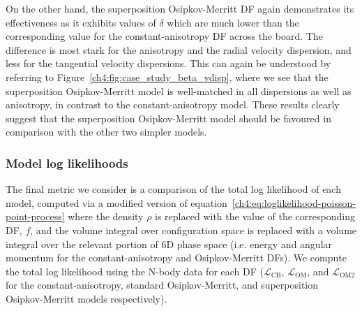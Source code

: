 On the other hand, the superposition Osipkov-Merritt DF again demonstrates its effectiveness as it exhibits values of $\delta$ which are much lower than the corresponding value for the constant-anisotropy DF across the board. The difference is most stark for the anisotropy and the radial velocity dispersion, and less for the tangential velocity dispersions. This can again be understood by referring to Figure~\ref{ch4:fig:case_study_beta_vdisp}, where we see that the superposition Osipkov-Merritt model is well-matched in all dispersions as well as anisotropy, in contrast to the constant-anisotropy model. These results clearly suggest that the superposition Osipkov-Merritt model should be favoured in comparison with the other two simpler models.

\subsubsection{Model log likelihoods}
\label{ch4:subsubsec:model-loglikelihoods}

The final metric we consider is a comparison of the total log likelihood of each model, computed via a modified version of equation~\eqref{ch4:eq:loglikelihood-poisson-point-process} where the density $\rho$ is replaced with the value of the corresponding DF, $f$, and the volume integral over configuration space is replaced with a volume integral over the relevant portion of 6D phase space (i.e. energy and angular momentum for the constant-anisotropy and Osipkov-Merritt DFs). We compute the total log likelihood using the N-body data for each DF ($\mathcal{L}_\mathrm{CB}$, $\mathcal{L}_\mathrm{OM}$, and $\mathcal{L}_\mathrm{OM2}$ for the constant-anisotropy, standard Osipkov-Merritt, and superposition Osipkov-Merritt models respectively).

